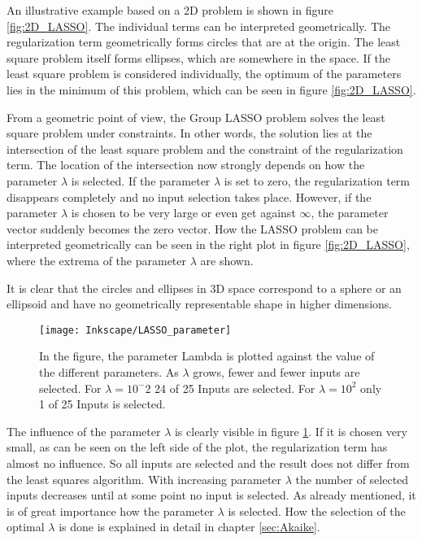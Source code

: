 An illustrative example based on a 2D problem is shown in figure \ref{fig:2D_LASSO}. The individual terms can be interpreted geometrically. The regularization term geometrically forms circles that are at the origin. The least square problem itself forms ellipses, which are somewhere in the space. If the least square problem is considered individually, the optimum of the parameters lies in the minimum of this problem, which can be seen in figure \ref{fig:2D_LASSO}. 

From a geometric point of view, the Group LASSO problem solves the least square problem under constraints. In other words, the solution lies at the intersection of the least square problem and the constraint of the regularization term. The location of the intersection now strongly depends on how the parameter $\lambda$ is selected. If the parameter $\lambda$ is set to zero, the regularization term disappears completely and no input selection takes place. However, if the parameter $\lambda$ is chosen to be very large or even get against $\infty$, the parameter vector suddenly becomes the zero vector. How the LASSO problem can be interpreted geometrically can be seen in the right plot in figure \ref{fig:2D_LASSO}, where the extrema of the parameter $\lambda$ are shown. 

It is clear that the circles and ellipses in 3D space correspond to a sphere or an ellipsoid and have no geometrically representable shape in higher dimensions.


\begin{figure}[!htb]
    \centering
    \texttt{[image: Inkscape/LASSO\_parameter]} %
    \caption[Influence of the $\lambda$ parameter]{In the figure, the parameter Lambda is plotted against the value of the different parameters. As $\lambda$ grows, fewer and fewer inputs are selected. For $\lambda = 10^-2$ 24 of 25 Inputs are selected. For $\lambda = 10^2$ only 1 of 25 Inputs is selected.
}
    \label{fig:LASSO_parameter}
\end{figure}

The influence of the parameter $\lambda$ is clearly visible in figure \ref{fig:LASSO_parameter}. If it is chosen very small, as can be seen on the left side of the plot, the regularization term has almost no influence. So all inputs are selected and the result does not differ from the least squares algorithm. With increasing parameter $\lambda$ the number of selected inputs decreases until at some point no input is selected. As already mentioned, it is of great importance how the parameter $\lambda$ is selected. How the selection of the optimal $\lambda$ is done is explained in detail in chapter \ref{sec:Akaike}.

